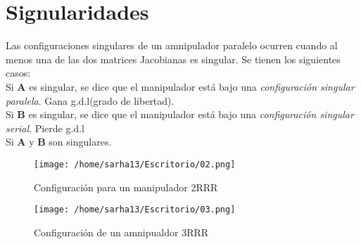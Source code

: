 \documentclass[letter,openright,12pt,spanish]{report}
\begin{document}
\section{Signularidades}

Las configuraciones singulares de un amnipulador paralelo ocurren cuando al menos una de las dos matrices Jacobianas es singular. Se tienen los siguientes casos:\\
Si \textbf{A} es singular, se dice que el manipulador est\'a bajo una \textit{configuraci\'on singular paralela}. Gana g.d.l(grado de libertad).\\
Si \textbf{B} es singular, se dice que el manipulador est\'a bajo una \textit{configuraci\'on singular serial}. Pierde g.d.l\\
Si \textbf{A} y \textbf{B} son singulares.

\begin{figure}[htp]
\centering
\texttt{[image: /home/sarha13/Escritorio/02.png]}
\caption{Configuraci\'on para un manipulador 2RRR}
\label{Figura 2}
\end{figure}

\begin{figure}[htp]
\centering
\texttt{[image: /home/sarha13/Escritorio/03.png]}
\caption{Configuraci\'on de un amnipualdor 3RRR}
\label{Figura 3.}
\end{figure}
\end{document}

